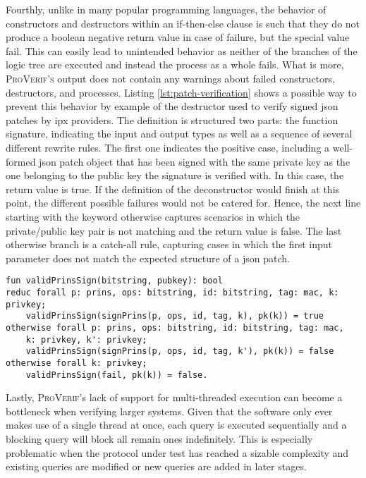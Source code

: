Fourthly, unlike in many popular programming languages, the behavior of constructors and destructors within an if-then-else clause is such that they do not produce a boolean negative return value in case of failure, but the special value {\sffamily fail}.
This can easily lead to unintended behavior as neither of the branches of the logic tree are executed and instead the process as a whole fails.
What is more, \textsc{ProVerif's} output does not contain any warnings about failed constructors, destructors, and processes.
Listing \ref{lst:patch-verification} shows a possible way to prevent this behavior by example of the destructor used to verify signed \gls{json} patches by \gls{ipx} providers.
The definition is structured two parts: the function signature, indicating the input and output types as well as a sequence of several different rewrite rules.
The first one indicates the positive case, including a well-formed \gls{json} patch object that has been signed with the same private key as the one belonging to the public key the signature is verified with.
In this case, the return value is \textsf{true}.
If the definition of the deconstructor would finish at this point, the different possible failures would not be catered for.
Hence, the next line starting with the keyword {\sffamily otherwise} captures scenarios in which the private/public key pair is not matching and the return value is \textsf{false}.
The last {\sffamily otherwise} branch is a catch-all rule, capturing cases in which the first input parameter does not match the expected structure of a \gls{json} patch.

\begin{lstlisting}[caption={Definition of deconstructors for patch validation},label={lst:patch-verification},firstnumber=149]
fun validPrinsSign(bitstring, pubkey): bool
reduc forall p: prins, ops: bitstring, id: bitstring, tag: mac, k: privkey;
    validPrinsSign(signPrins(p, ops, id, tag, k), pk(k)) = true
otherwise forall p: prins, ops: bitstring, id: bitstring, tag: mac,
    k: privkey, k': privkey;
    validPrinsSign(signPrins(p, ops, id, tag, k'), pk(k)) = false
otherwise forall k: privkey;
    validPrinsSign(fail, pk(k)) = false.
\end{lstlisting}


Lastly, \textsc{ProVerif}'s lack of support for multi-threaded execution can become a bottleneck when verifying larger systems.
Given that the software only ever makes use of a single thread at once, each query is executed sequentially and a blocking query will block all remain ones indefinitely.
This is especially problematic when the protocol under test has reached a sizable complexity and existing queries are modified or new queries are added in later stages.

